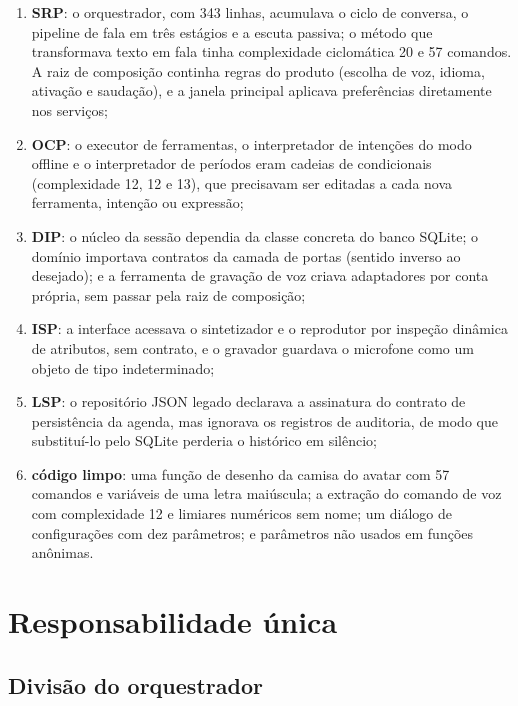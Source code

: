 \begin{enumerate}[label=\alph*)]
  \item \textbf{SRP}: o orquestrador, com 343 linhas, acumulava o ciclo de conversa, o pipeline de fala
        em três estágios e a escuta passiva; o método que transformava texto em fala tinha complexidade
        ciclomática 20 e 57 comandos. A raiz de composição continha regras do produto (escolha de voz,
        idioma, ativação e saudação), e a janela principal aplicava preferências diretamente nos serviços;
  \item \textbf{OCP}: o executor de ferramentas, o interpretador de intenções do modo offline e o
        interpretador de períodos eram cadeias de condicionais (complexidade 12, 12 e 13), que precisavam
        ser editadas a cada nova ferramenta, intenção ou expressão;
  \item \textbf{DIP}: o núcleo da sessão dependia da classe concreta do banco SQLite; o domínio importava
        contratos da camada de portas (sentido inverso ao desejado); e a ferramenta de gravação de voz
        criava adaptadores por conta própria, sem passar pela raiz de composição;
  \item \textbf{ISP}: a interface acessava o sintetizador e o reprodutor por inspeção dinâmica de
        atributos, sem contrato, e o gravador guardava o microfone como um objeto de tipo indeterminado;
  \item \textbf{LSP}: o repositório JSON legado declarava a assinatura do contrato de persistência da
        agenda, mas ignorava os registros de auditoria, de modo que substituí-lo pelo SQLite perderia o
        histórico em silêncio;
  \item \textbf{código limpo}: uma função de desenho da camisa do avatar com 57 comandos e variáveis de
        uma letra maiúscula; a extração do comando de voz com complexidade 12 e limiares numéricos sem
        nome; um diálogo de configurações com dez parâmetros; e parâmetros não usados em funções anônimas.
\end{enumerate}

\section{Responsabilidade única}

\subsection{Divisão do orquestrador}

